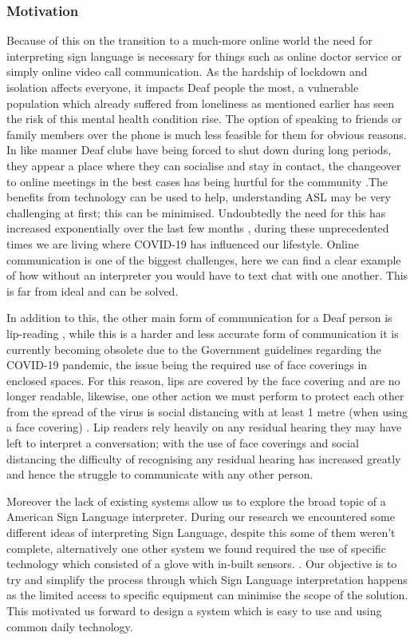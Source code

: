 \documentclass[10pt]{article}
\begin{document}
\subsubsection{Motivation}

Because of this on the transition to a much-more online world the need for interpreting sign 
language is necessary for things such as online doctor service or simply online video call 
communication. As the hardship of lockdown and isolation affects everyone, it impacts Deaf people 
the most, a vulnerable population which already suffered from loneliness as mentioned earlier has 
seen the risk of this mental health condition rise. The option of speaking to friends or family 
members over the phone is much less feasible for them for obvious reasons. In like manner Deaf clubs 
have being forced to shut down during long periods, they appear a place where they can socialise and 
stay in contact, the changeover to online meetings in the best cases has being hurtful for the 
community \cite{heren_2020}.The benefits from technology can be used to help, understanding ASL may 
be very challenging at first; this can be minimised. Undoubtedly the need for this has increased 
exponentially over the last few months \cite{kalia_2020}, during these unprecedented times we are 
living where COVID-19 has influenced our lifestyle. Online communication is one of the biggest 
challenges, here we can find a clear example of how without an interpreter you would have to text 
chat with one another. This is far from ideal and can be solved. 

In addition to this, the other main form of communication for a Deaf person is lip-reading 
\cite{hearing_dogs_for_deaf_people}, while this is a harder and less accurate form of communication 
it is currently becoming obsolete due to the Government guidelines regarding the COVID-19 pandemic, 
the issue being the required use of face coverings in enclosed spaces. For this reason, lips are 
covered by the face covering and are no longer readable, likewise, one other action we must perform 
to protect each other from the spread of the virus is social distancing with at least 1 metre (when 
using a face covering) \cite{gov.uk_2020}. Lip readers rely heavily on any residual hearing they may 
have left to interpret a conversation; with the use of face coverings and social distancing the 
difficulty of recognising any residual hearing has increased greatly and hence the struggle to 
communicate with any other person. 

Moreover the lack of existing systems allow us to explore the broad topic of a American Sign 
Language interpreter. During our research we encountered some different ideas of interpreting Sign 
Language, despite this some of them weren't complete, alternatively one other system we found 
required the use of specific technology which consisted of a glove with in-built sensors. 
\cite{mehdi_khan_2002}. Our objective is to try and simplify the process through which Sign Language 
interpretation happens as the limited access to specific equipment can minimise the scope of the 
solution. This motivated us forward to design a system which is easy to use and using common daily 
technology. 
\end{document}
